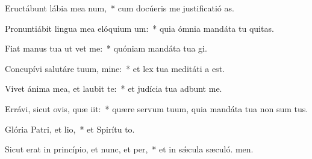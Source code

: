 \item Eructábunt lábia mea num,~* cum docúeris me justificatió as.
\item Pronuntiábit lingua mea elóquium um:~* quia ómnia mandáta tu quitas.
\item Fiat manus tua ut vet me:~* quóniam mandáta tua gi.
\item Concupívi salutáre tuum, mine:~* et lex tua meditáti a est.
\item Vivet ánima mea, et laubit te:~* et judícia tua adbunt me.
\item Errávi, sicut ovis, quæ iit:~* quære servum tuum, quia mandáta tua non sum tus.
\item Glória Patri, et lio,~* et Spirítu to.
\item Sicut erat in princípio, et nunc, et per,~* et in sǽcula sæculó. men.
